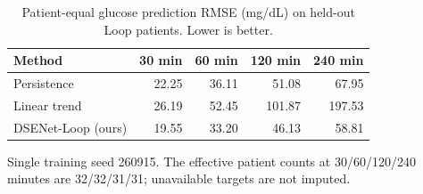 \begin{table}[t]
\centering
\small
\caption{Patient-equal glucose prediction RMSE (mg/dL) on held-out Loop patients. Lower is better.}
\label{tab:loop-forecast}
\begin{tabular}{lrrrr}
\toprule
Method & 30 min & 60 min & 120 min & 240 min \\
\midrule
Persistence & 22.25 & 36.11 & 51.08 & 67.95 \\
Linear trend & 26.19 & 52.45 & 101.87 & 197.53 \\
DSENet-Loop (ours) & 19.55 & 33.20 & 46.13 & 58.81 \\
\bottomrule
\end{tabular}
\par
\footnotesize Single training seed 260915. The effective patient counts at 30/60/120/240 minutes are 32/32/31/31; unavailable targets are not imputed.
\end{table}
